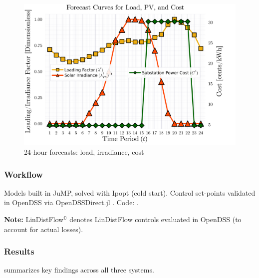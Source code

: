 \begin{figure}[h]
    \centering
    \includegraphics[height=0.2\textheight]{figures/T24-inputCurves/Horizon_24_InputForecastCurves_bilevelCosts.png}
    \caption{24-hour forecasts: load, irradiance, cost}
    \label{fig:mpopf-input}
\end{figure}

\subsubsection{Workflow}

Models built in JuMP, solved with Ipopt (cold start). Control set-points validated in OpenDSS via OpenDSSDirect.jl \cite{OpenDSSDirect-jl}. Code: \cite{MPOPFRepo}.

\textbf{Note:} LinDistFlow$^{\mathbb{O}}$ denotes LinDistFlow controls evaluated in OpenDSS (to account for actual losses).

\subsubsection{Results}

 summarizes key findings across all three systems.

